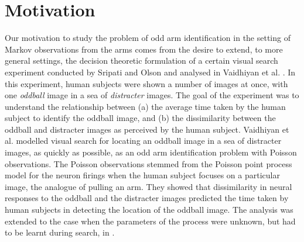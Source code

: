 \section{Motivation}
Our motivation to study the problem of odd arm identification in the setting of Markov observations from the arms comes from the desire to extend, to more general settings, the decision theoretic formulation of a certain visual search experiment conducted by Sripati and Olson \cite{sripati2010global} and analysed in Vaidhiyan et al. \cite{Vaidhiyan2017,vaidhiyan2012active}. In this experiment, human subjects were shown a number of images at once, with one {\em oddball} image in a sea of {\em distracter} images. The goal of the experiment was to understand the relationship between (a) the average time taken by the human subject to identify the oddball image, and (b) the dissimilarity between the oddball and distracter images as perceived by the human subject. Vaidhiyan et al. modelled visual search for locating an oddball image in a sea of distracter images, as quickly as possible, as an odd arm identification problem with Poisson observations. The Poisson observations stemmed from the Poisson point process model for the neuron firings when the human subject focuses on a particular image, the analogue of pulling an arm. They showed that dissimilarity in neural responses to the oddball and the distracter images predicted the time taken by human subjects in detecting the location of the oddball image. The analysis was extended to the case when the parameters of the process were unknown, but had to be learnt during search, in \cite{vaidhiyan2017learning}. 


